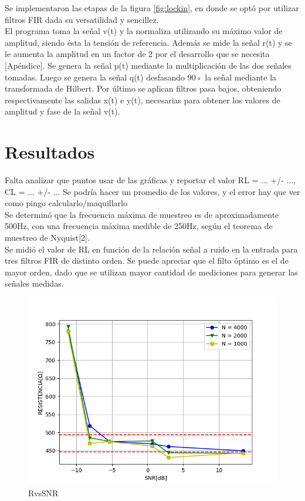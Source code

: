\documentclass[11pt,a4paper]{extarticle}
\begin{document}
\begin{multicols}{2}
Se implementaron 
las etapas de la figura \ref{fig:lockin}, en donde 
se optó por utilizar filtros FIR dada su versatilidad 
y sencillez.\\

El programa toma la señal v(t)
y la normaliza utilizando su máximo valor de amplitud,
 siendo ésta la tensión de referencia. Además se mide 
 la señal r(t) y se le aumenta la amplitud en un factor
 de 2 por el desarrollo que se necesita [Apéndice].
Se genera la señal p(t) mediante la multiplicación de 
las dos señales tomadas.
Luego se genera la señal q(t) desfasando 90◦
la señal 
mediante la transformada de Hilbert.
Por último se aplican filtros pasa bajos,
 obteniendo respectivamente las salidas x(t) e y(t),
  necesarias para obtener los
valores de amplitud y fase de la señal v(t).


\section{Resultados}

Falta analizar que puntos usar de las gráficas y reportar
el valor RL = ... +/- ..., CL = ... +/- ...
Se podría hacer un promedio de los valores, y el error hay 
que ver como pingo calcularlo/maquillarlo\\
Se determinó que la frecuencia máxima de muestreo es 
de aproximadamente 
500Hz, con una frecuencia máxima medible de 250Hz, 
según el teorema de muestreo de Nyquist[2].\\

Se midió el valor de RL en función 
de la relación señal a ruido en la entrada para tres 
filtros FIR de distinto orden.
Se puede apreciar que el filto óptimo es el de mayor 
orden, dado que se utilizan mayor cantidad de 
mediciones para generar las señales medidas.

\begin{figure}[H]
	\centering
	\includegraphics[width=\linewidth]{Images/RvsSNR(segunda).png}
	\caption{RvsSNR}
	\label{fig:RvsSNR}
\end{figure}


\end{multicols}
\end{document}
